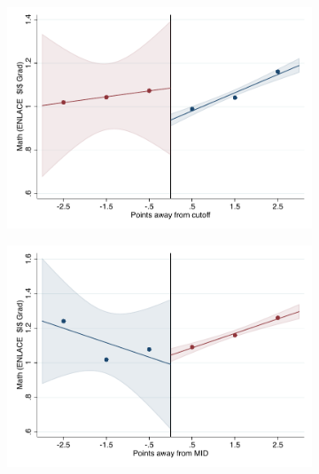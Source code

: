 \documentclass[oneside,11pt]{article}
\begin{document}
\begin{figure}[H]
\begin{center}
    \begin{subfigure}{0.475\textwidth}
        \centering
        \includegraphics[width=\textwidth]{04_Figures/rd_plot_tau_p_mat_3_pdelta3.pdf}
    \end{subfigure}
    \begin{subfigure}{0.475\textwidth}
        \centering
        \includegraphics[width=\textwidth]{04_Figures/rd_plot_mid_p_mat_3_pdelta3.pdf}
    \end{subfigure}


\end{center}
\end{figure}
\end{document}
